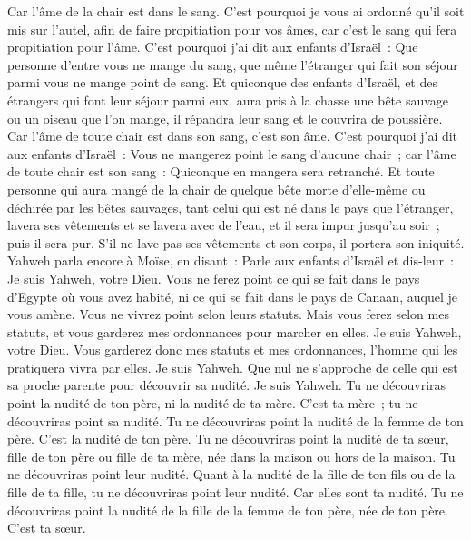 \begin{multicols}{2}
Car l'âme de la chair est dans le sang. C'est pourquoi je vous ai ordonné qu'il soit mis sur l'autel, afin de faire propitiation pour vos âmes, car c'est le sang qui fera propitiation pour l'âme.
C'est pourquoi j'ai dit aux enfants d'Israël~: Que personne d'entre vous ne mange du sang, que même l'étranger qui fait son séjour parmi vous ne mange point de sang.
Et quiconque des enfants d'Israël, et des étrangers qui font leur séjour parmi eux, aura pris à la chasse une bête sauvage ou un oiseau que l'on mange, il répandra leur sang et le couvrira de poussière.
Car l'âme de toute chair est dans son sang, c'est son âme. C'est pourquoi j'ai dit aux enfants d'Israël~: Vous ne mangerez point le sang d'aucune chair~; car l'âme de toute chair est son sang~: Quiconque en mangera sera retranché.
Et toute personne qui aura mangé de la chair de quelque bête morte d'elle-même ou déchirée par les bêtes sauvages, tant celui qui est né dans le pays que l'étranger, lavera ses vêtements et se lavera avec de l'eau, et il sera impur jusqu'au soir~; puis il sera pur.
S'il ne lave pas ses vêtements et son corps, il portera son iniquité.
\VerseOne{}Yahweh parla encore à Moïse, en disant~:
Parle aux enfants d'Israël et dis-leur~: Je suis Yahweh, votre Dieu.
Vous ne ferez point ce qui se fait dans le pays d'Egypte où vous avez habité, ni ce qui se fait dans le pays de Canaan, auquel je vous amène. Vous ne vivrez point selon leurs statuts.
Mais vous ferez selon mes statuts, et vous garderez mes ordonnances pour marcher en elles. Je suis Yahweh, votre Dieu.
Vous garderez donc mes statuts et mes ordonnances, l'homme qui les pratiquera vivra par elles. Je suis Yahweh.
Que nul ne s'approche de celle qui est sa proche parente pour découvrir sa nudité. Je suis Yahweh.
Tu ne découvriras point la nudité de ton père, ni la nudité de ta mère. C'est ta mère~; tu ne découvriras point sa nudité.
Tu ne découvriras point la nudité de la femme de ton père. C'est la nudité de ton père.
Tu ne découvriras point la nudité de ta sœur, fille de ton père ou fille de ta mère, née dans la maison ou hors de la maison. Tu ne découvriras point leur nudité.
Quant à la nudité de la fille de ton fils ou de la fille de ta fille, tu ne découvriras point leur nudité. Car elles sont ta nudité.
Tu ne découvriras point la nudité de la fille de la femme de ton père, née de ton père. C'est ta sœur.

\end{multicols}
